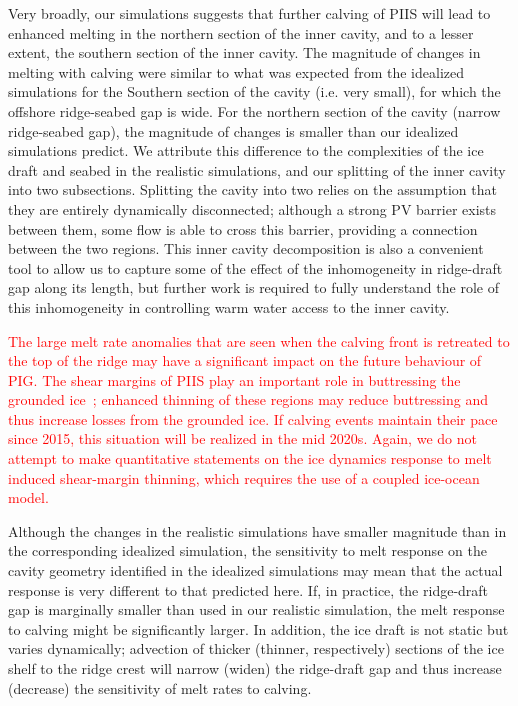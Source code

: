 \documentclass[draft]{agujournal2019}
\newcommand{\red}[1]{\textcolor{red}{#1}}
\begin{document}
Very broadly, our simulations suggests that further calving of PIIS will lead to enhanced melting in the northern section of the inner cavity, and to a lesser extent, the southern section of the inner cavity. The magnitude of changes in melting with calving were similar to what was expected from the idealized simulations for the Southern section of the cavity (i.e. very small), for which the offshore ridge-seabed gap is wide. For the northern section of the cavity (narrow ridge-seabed gap), the magnitude of changes is smaller than our idealized simulations predict. We attribute this difference to the complexities of the ice draft and seabed in the realistic simulations, and our splitting of the inner cavity into two subsections. Splitting the cavity into two relies on the assumption that they are entirely dynamically disconnected; although a strong PV barrier exists between them, some flow is able to cross this barrier, providing a connection between the two regions. This inner cavity decomposition is also a convenient tool to allow us to capture some of the effect of the inhomogeneity in ridge-draft gap along its length, but further work is required to fully understand the role of this inhomogeneity in controlling warm water access to the inner cavity.  

\red{The large melt rate anomalies that are seen when the calving front is retreated to the top of the ridge may have a significant impact on the future behaviour of PIG. The shear margins of PIIS play an important role in buttressing the grounded ice~\cite{Lhermitte2020PNAS}; enhanced thinning of these regions may reduce buttressing and thus increase losses from the grounded ice. If calving events maintain their pace since 2015, this situation will be realized in the mid 2020s. Again, we do not attempt to make quantitative statements on the ice dynamics response to melt induced shear-margin thinning, which requires the use of a coupled ice-ocean model.}

Although the changes in the realistic simulations have smaller magnitude than in the corresponding idealized simulation, the sensitivity to melt response on the cavity geometry identified in the idealized simulations may mean that the actual response is very different to that predicted here. If, in practice, the ridge-draft gap is marginally smaller than used in our realistic simulation, the melt response to calving might be significantly larger. In addition, the ice draft is not static but varies dynamically; advection of thicker (thinner, respectively) sections of the ice shelf to the ridge crest will narrow (widen) the ridge-draft gap and thus increase (decrease) the sensitivity of melt rates to calving.
\end{document}

